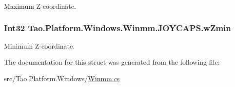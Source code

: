 Maximum Z-\/coordinate. 

\hypertarget{struct_tao_1_1_platform_1_1_windows_1_1_winmm_1_1_j_o_y_c_a_p_s_a9563d825a5274a0c8fb7a738ccc816c6}{
\subsubsection[{wZmin}]{\setlength{\rightskip}{0pt plus 5cm}Int32 {\bf Tao.Platform.Windows.Winmm.JOYCAPS.wZmin}}}
\label{struct_tao_1_1_platform_1_1_windows_1_1_winmm_1_1_j_o_y_c_a_p_s_a9563d825a5274a0c8fb7a738ccc816c6}


Minimum Z-\/coordinate. 



The documentation for this struct was generated from the following file:\begin{DoxyCompactItemize}
\item 
src/Tao.Platform.Windows/\hyperlink{_winmm_8cs}{Winmm.cs}\end{DoxyCompactItemize}
